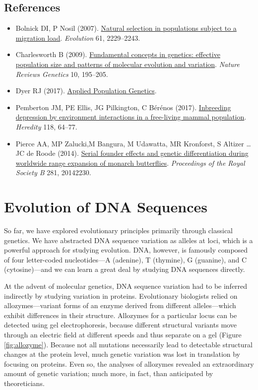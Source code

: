 \documentclass[
]{book}
\begin{document}
\hypertarget{references-6}{%
\section{References}\label{references-6}}

\begin{itemize}
\item
  Bolnick DI, P Nosil (2007). \href{https://onlinelibrary.wiley.com/doi/full/10.1111/j.1558-5646.2007.00179.x}{Natural selection in populations subject to a migration load}. \emph{Evolution} 61, 2229--2243.
\item
  Charlesworth B (2009). \href{https://www.nature.com/articles/nrg2526}{Fundamental concepts in genetics: effective population size and patterns of molecular evolution and variation}. \emph{Nature Reviews Genetics} 10, 195--205.
\item
  Dyer RJ (2017). \href{https://dyerlab.github.io/applied_population_genetics/}{Applied Population Genetics}.
\item
  Pemberton JM, PE Ellis, JG Pilkington, C Bérénos (2017). \href{https://www.nature.com/articles/hdy2016100}{Inbreeding depression by environment interactions in a free-living mammal population}. \emph{Heredity} 118, 64--77.
\item
  Pierce AA, MP Zalucki,M Bangura, M Udawatta, MR Kronforst, S Altizer \ldots{} JC de Roode (2014). \href{https://royalsocietypublishing.org/doi/10.1098/rspb.2014.2230}{Serial founder effects and genetic differentiation during worldwide range expansion of monarch butterflies}. \emph{Proceedings of the Royal Society B} 281, 20142230.
\end{itemize}

\hypertarget{evolution-of-dna-sequences}{%
\chapter{Evolution of DNA Sequences}\label{evolution-of-dna-sequences}}

So far, we have explored evolutionary principles primarily through classical genetics. We have abstracted DNA sequence variation as alleles at loci, which is a powerful approach for studying evolution. DNA, however, is famously composed of four letter-coded nucleotides---A (adenine), T (thymine), G (guanine), and C (cytosine)---and we can learn a great deal by studying DNA sequences directly.

At the advent of molecular genetics, DNA sequence variation had to be inferred indirectly by studying variation in proteins. Evolutionary biologists relied on allozymes---variant forms of an enzyme derived from different alleles---which exhibit differences in their structure. Allozymes for a particular locus can be detected using gel electrophoresis, because different structural variants move through an electric field at different speeds and thus separate on a gel (Figure \ref{fig:allozyme}). Because not all mutations necessarily lead to detectable structural changes at the protein level, much genetic variation was lost in translation by focusing on proteins. Even so, the analyses of allozymes revealed an extraordinary amount of genetic variation; much more, in fact, than anticipated by theoreticians.
\end{document}
